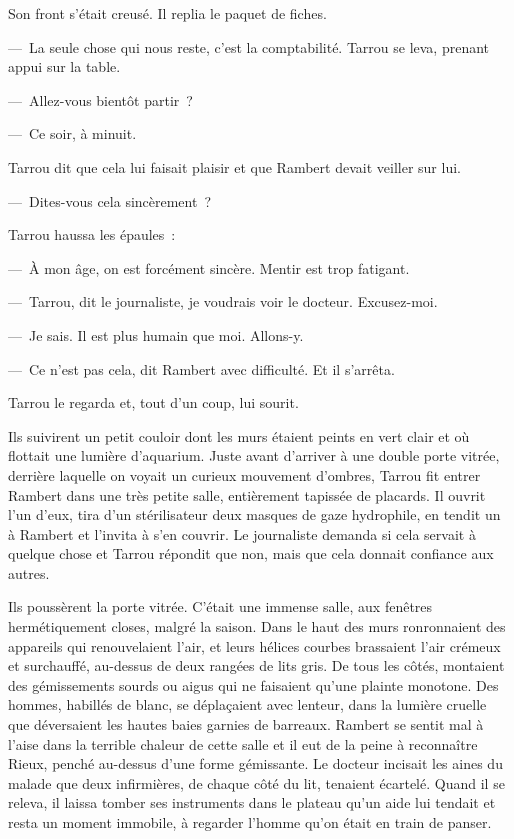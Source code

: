 \documentclass[french,twoside]{book} %
\begin{document}
Son front s’était creusé. Il replia le paquet de fiches.\par
— La seule chose qui nous reste, c’est la comptabilité. Tarrou se leva, prenant appui sur la table.\par
— Allez-vous bientôt partir ?\par
— Ce soir, à minuit.\par
Tarrou dit que cela lui faisait plaisir et que Rambert devait veiller sur lui.\par
— Dites-vous cela sincèrement ?\par
Tarrou haussa les épaules :\par
— À mon âge, on est forcément sincère. Mentir est trop fatigant.\par
— Tarrou, dit le journaliste, je voudrais voir le docteur. Excusez-moi.\par
— Je sais. Il est plus humain que moi. Allons-y.\par
— Ce n’est pas cela, dit Rambert avec difficulté. Et il s’arrêta.\par
Tarrou le regarda et, tout d’un coup, lui sourit.\par
Ils suivirent un petit couloir dont les murs étaient peints en vert clair et où flottait une lumière d’aquarium. Juste avant d’arriver à une double porte vitrée, derrière laquelle on voyait un curieux mouvement d’ombres, Tarrou fit entrer Rambert dans une très petite salle, entièrement tapissée de placards. Il ouvrit l’un d’eux, tira d’un stérilisateur deux masques de gaze hydrophile, en tendit un à Rambert et l’invita à s’en couvrir. Le journaliste demanda si cela servait à quelque chose et Tarrou répondit que non, mais que cela donnait confiance aux autres.\par
Ils poussèrent la porte vitrée. C’était une immense salle, aux fenêtres hermétiquement closes, malgré la saison. Dans le haut des murs ronronnaient des appareils qui renouvelaient l’air, et leurs hélices courbes brassaient l’air crémeux et surchauffé, au-dessus de deux rangées de lits gris. De tous les côtés, montaient des gémissements sourds ou aigus qui ne faisaient qu’une plainte monotone. Des hommes, habillés de blanc, se déplaçaient avec lenteur, dans la lumière cruelle que déversaient les hautes baies garnies de barreaux. Rambert se sentit mal à l’aise dans la terrible chaleur de cette salle et il eut de la peine à reconnaître Rieux, penché au-dessus d’une forme gémissante. Le docteur incisait les aines du malade que deux infirmières, de chaque côté du lit, tenaient écartelé. Quand il se releva, il laissa tomber ses instruments dans le plateau qu’un aide lui tendait et resta un moment immobile, à regarder l’homme qu’on était en train de panser.\par
\end{document}
